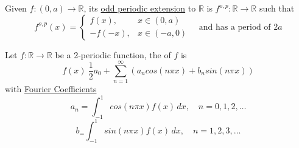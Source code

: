 \begin{definition}
    Given $f:(0, a) \rightarrow \mathbb{R}$, its \underline{odd periodic extension} to $\mathbb{R} $ is $f^{o,p}: \mathbb{R} \rightarrow \mathbb{R}$ such that
    \[
    f^{o,p}(x) = \begin{cases}
        f(x), & x \in (0,a) \\
        -f(-x), & x\in(-a, 0)
    \end{cases} \quad \text{and has a period of } 2a
    \]
\end{definition}

\begin{definition}
    Let $f:\mathbb{R} \rightarrow \mathbb{R}$ be a 2-periodic function, the  of $f$ is
    \[f(x) ~ \frac{1}{2}a_0 + \sum_{n=1}^{\infty}(a_n cos (n\pi x) + b_n sin(n\pi x))\]
    with \underline{Fourier Coefficients}
    \[a_n = \int_{-1}^{1}cos(n \pi x)f(x)\,dx, \quad n=0,1,2,\dots\]
    \[b_ = \int_{-1}^{1}sin(n\pi x)f(x)  \,dx, \quad n = 1,2,3,\dots \]
\end{definition}

